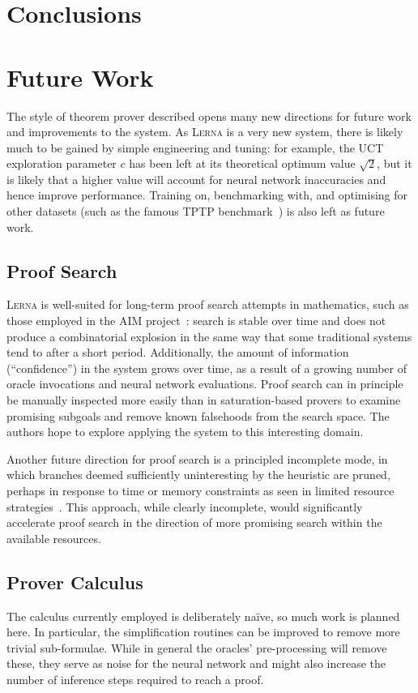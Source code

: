 \documentclass[runningheads]{llncs}
\newcommand{\lerna}{\textsc{Lerna}}
\begin{document}
\section{Conclusions}
\section{Future Work}
The style of theorem prover described opens many new directions for future work and improvements to the system.
As \lerna{} is a very new system, there is likely much to be gained by simple engineering and tuning: for example, the UCT exploration parameter \(c\) has been left at its theoretical optimum value \(\sqrt{2}\), but it is likely that a higher value will account for neural network inaccuracies and hence improve performance.
Training on, benchmarking with, and optimising for other datasets (such as the famous TPTP benchmark~\cite{TPTP}) is also left as future work.

\subsection{Proof Search}
\lerna{} is well-suited for long-term proof search attempts in mathematics, such as those employed in the AIM project~\cite{AIM}: search is stable over time and does not produce a combinatorial explosion in the same way that some traditional systems tend to after a short period.
Additionally, the amount of information (``confidence'') in the system grows over time, as a result of a growing number of oracle invocations and neural network evaluations.
Proof search can in principle be manually inspected more easily than in saturation-based provers to examine promising subgoals and remove known falsehoods from the search space.
The authors hope to explore applying the system to this interesting domain.

Another future direction for proof search is a principled incomplete mode, in which branches deemed sufficiently uninteresting by the heuristic are pruned, perhaps in response to time or memory constraints as seen in limited resource strategies~\cite{LRS}.
This approach, while clearly incomplete, would significantly accelerate proof search in the direction of more promising search within the available resources.

\subsection{Prover Calculus}
The calculus currently employed is deliberately na\"ive, so much work is planned here.
In particular, the simplification routines can be improved to remove more trivial sub-formulae.
While in general the oracles' pre-processing will remove these, they serve as noise for the neural network and might also increase the number of inference steps required to reach a proof.
\end{document}
